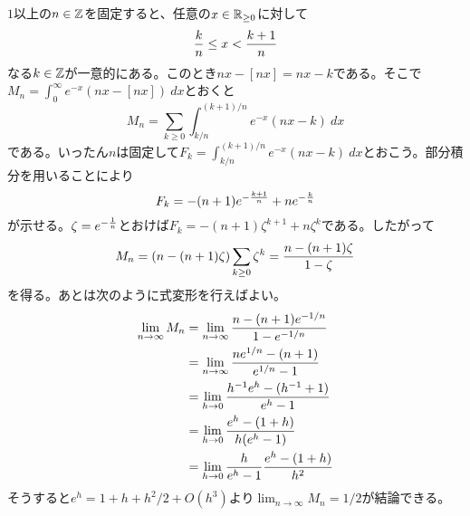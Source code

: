 \begin{sol}
  $1$以上の$n \in {\mathbb Z}$を固定すると、任意の$x \in {\mathbb R}_{\geq 0}$に対して
  \[
  \frac{k}{n} \leq x < \frac{k+1}{n}
  \]
  なる$k \in {\mathbb Z}$が一意的にある。このとき$nx - [nx] = nx - k$である。そこで$M_n = \int_0^{\infty} e^{-x}(nx - [nx]) \ dx$とおくと
  \[
  M_n = \sum_{k \geq 0} \int_{k/n}^{(k+1)/n} e^{-x}(nx - k) \ dx
  \]
  である。いったん$n$は固定して$F_k = \int_{k/n}^{(k+1)/n} e^{-x}(nx - k) \ dx$とおこう。部分積分を用いることにより
  \[
  F_k = -(n+1) e^{-\frac{k+1}{n}} + n e^{- \frac{k}{n}}
  \]
  が示せる。$\zeta = e^{-\frac{1}{n}}$とおけば$F_k = -(n+1)\zeta^{k+1} + n \zeta^k$である。したがって
  \begin{align*}
    M_n = (n - (n+1)\zeta) \sum_{k \geq 0} \zeta^k = \frac{n - (n+1)\zeta}{1 - \zeta}
  \end{align*}
  を得る。あとは次のように式変形を行えばよい。
  \begin{align*}
\lim_{n \to \infty} M_n &= \lim_{n \to \infty}  \frac{n - (n+1)e^{-1/n} }{1 - e^{-1/n}} \\
&= \lim_{n \to \infty}  \frac{ne^{1/n} - (n+1) }{e^{1/n} - 1} \\
&= \lim_{h \to 0}  \frac{ h^{-1} e^{h} - (h^{-1}+1) }{e^{h} - 1} \\
&= \lim_{h \to 0}  \frac{ e^{h} - (1 + h) }{ h(e^{h} - 1) } \\
&= \lim_{h \to 0}  \frac{h}{ e^{h} - 1 } \frac{ e^h - (1+h) }{ h^2 }
  \end{align*}
そうすると$e^h = 1 + h + h^2/2 + O(h^3)$より$\lim_{n \to \infty} M_n = 1/2$が結論できる。
\end{sol}

\newpage

